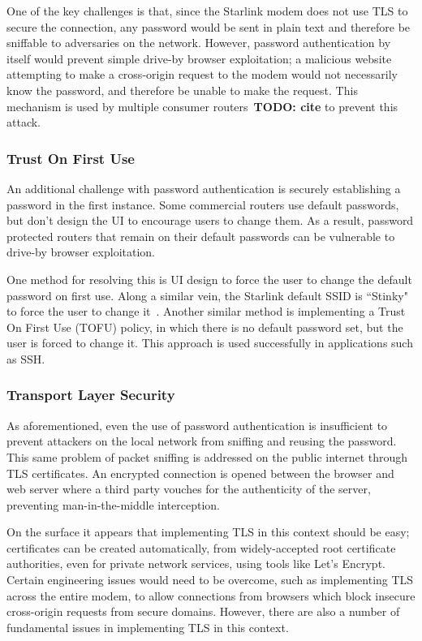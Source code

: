 One of the key challenges is that, since the Starlink modem does not use TLS to secure the connection, any password would be sent in plain text and therefore be sniffable to adversaries on the network.
However, password authentication by itself would prevent simple drive-by browser exploitation; a malicious website attempting to make a cross-origin request to the modem would not necessarily know the password, and therefore be unable to make the request.
This mechanism is used by multiple consumer routers~\textbf{TODO: cite} to prevent this attack.

\subsubsection{Trust On First Use}

An additional challenge with password authentication is securely establishing a password in the first instance.
Some commercial routers use default passwords, but don't design the UI to encourage users to change them.
As a result, password protected routers that remain on their default passwords can be vulnerable to drive-by browser exploitation.

One method for resolving this is UI design to force the user to change the default password on first use.
Along a similar vein, the Starlink default SSID is ``Stinky" to force the user to change it~\cite{stinky_starlink}.
Another similar method is implementing a Trust On First Use (TOFU) policy, in which there is no default password set, but the user is forced to change it.
This approach is used successfully in applications such as SSH.

\subsubsection{Transport Layer Security}

As aforementioned, even the use of password authentication is insufficient to prevent attackers on the local network from sniffing and reusing the password.
This same problem of packet sniffing is addressed on the public internet through TLS certificates.
An encrypted connection is opened between the browser and web server where a third party vouches for the authenticity of the server, preventing man-in-the-middle interception.

On the surface it appears that implementing TLS in this context should be easy; certificates can be created automatically, from widely-accepted root certificate authorities, even for private network services, using tools like Let's Encrypt.
Certain engineering issues would need to be overcome, such as implementing TLS across the entire modem, to allow connections from browsers which block insecure cross-origin requests from secure domains.
However, there are also a number of fundamental issues in implementing TLS in this context.

